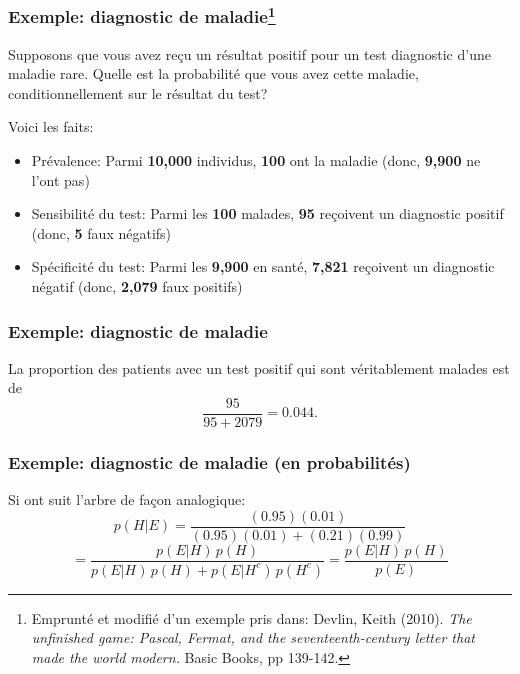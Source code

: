 \documentclass{beamer}
\begin{document}
\begin{frame}
    \frametitle{Exemple: diagnostic de maladie\footnote{
        Emprunté et modifié d'un exemple pris dans: Devlin, Keith (2010).
        \emph{The unfinished game: Pascal, Fermat, and the seventeenth-century letter that made the world modern.}
        Basic Books, pp 139-142.
    }}
    Supposons que vous avez reçu un résultat positif pour un test diagnostic d'une maladie rare.
    Quelle est la probabilité que vous avez cette maladie, conditionnellement sur le résultat du test?

    \pause

    \vfill

    Voici les faits:
    \begin{itemize}
      \item Prévalence: Parmi \textbf{10,000} individus, \textbf{100} ont la maladie (donc, \textbf{9,900} ne l'ont pas)
      \pause
      \item Sensibilité du test: Parmi les \textbf{100} malades,
            \textbf{95} reçoivent un diagnostic positif (donc, \textbf{5} faux négatifs)
      \pause
      \item Spécificité du test: Parmi les \textbf{9,900} en santé,
            \textbf{7,821} reçoivent un diagnostic négatif (donc, \textbf{2,079} faux positifs)
    \end{itemize}
\end{frame}


\begin{frame}
    \frametitle{Exemple: diagnostic de maladie}
    \begin{figure}
      \centering
      \scalebox{0.75}{}
    \end{figure}

    \pause

    La proportion des patients avec un test positif qui sont véritablement malades est de
    \[\frac{95}{95 + 2079} = 0.044 .\]
\end{frame}


\begin{frame}
    \frametitle{Exemple: diagnostic de maladie (en probabilités)}
    \begin{figure}
      \centering
      \scalebox{0.65}{}
    \end{figure}

    \pause

    Si ont suit l'arbre de façon analogique:
    \[p(H | E) = \frac{(0.95)(0.01)}{(0.95)(0.01) + (0.21)(0.99)}\]
    \pause
    \[ = \frac{p(E | H) \, p(H)}{p(E | H) \, p(H) + p(E | H^c) \, p(H^c)} = \frac{p(E | H) \, p(H)}{p(E)}\]
\end{frame}
\end{document}
